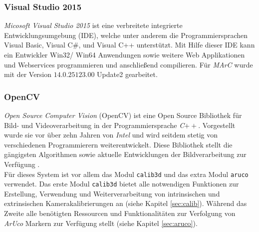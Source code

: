 \subsubsection{Visual Studio 2015}\label{sec:VisualStudio} 
\textit{Micosoft Visual Studio 2015} ist eine verbreitete integrierte Entwicklungsumgebung (IDE), welche unter anderem die Programmiersprachen Visual Basic, Visual C$\#$, und Visual C++ unterstützt. Mit Hilfe dieser IDE kann ein Entwickler Win32/ Win64 Anwendungen sowie weitere Web Applikationen und Webservices \cite{website:VisuStud} programmieren und anschließend compilieren. Für \textit{MArC} wurde mit der Version $14.0.25123.00$ Update2 gearbeitet.

\subsubsection{OpenCV} \label{sec:OpenCV} 
\textit{Open Source Computer Vision} (OpenCV) ist eine Open Source Bibliothek für Bild- und Videoverarbeitung in der Programmiersprache \textit{C}$++$. Vorgestellt wurde sie vor über zehn Jahren von \textit{Intel} und wird seitdem stetig von verschiedenen Programmierern weiterentwickelt. Diese Bibliothek stellt die gängigsten Algorithmen sowie aktuelle Entwicklungen der Bildverarbeitung zur Verfügung
\cite{article:OpenCV}.\\
Für dieses System ist vor allem das Modul \texttt{calib3d} \cite{website:Calib3dDoc} und das extra Modul \texttt{aruco} \cite{website:ArucoDoc} verwendet. Das erste Modul \texttt{calib3d}  bietet alle notwendigen Funktionen zur Erstellung, Verwendung und Weiterverarbeitung von intrinsischen und extrinsischen Kamerakalibrierungen an (siehe Kapitel \ref{sec:calib}). Während das Zweite alle benötigten Ressourcen und Funktionalitäten zur Verfolgung von \textit{ArUco} Markern zur Verfügung stellt (siehe Kapitel \ref{sec:aruco}).

